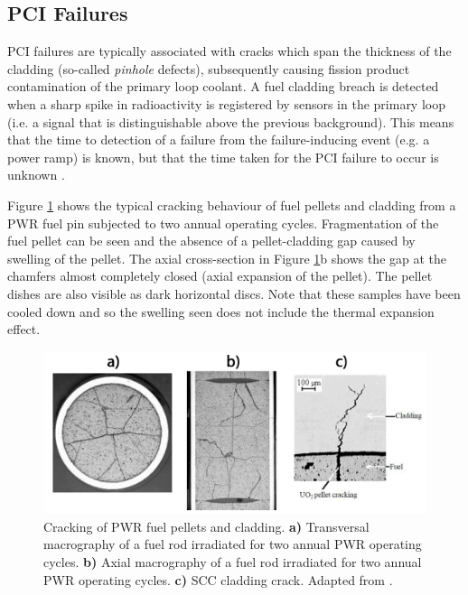 \subsection{PCI Failures}

PCI failures are typically associated with cracks which span the thickness of the cladding (so-called \emph{pinhole} defects), subsequently causing fission product contamination of the primary loop coolant. A fuel cladding breach is detected when a sharp spike in radioactivity is registered by sensors in the primary loop (i.e. a signal that is distinguishable above the previous background). This means that the time to detection of a failure from the failure-inducing event (e.g. a power ramp) is known, but that the time taken for the PCI failure to occur is unknown \cite{bcoxpelletclad1990}. 

Figure \ref{figure:fuelcladdingcrack} shows the typical cracking behaviour of fuel pellets and cladding from a PWR fuel pin subjected to two annual operating cycles. Fragmentation of the fuel pellet can be seen and the absence of a pellet-cladding gap caused by swelling of the pellet. The axial cross-section in Figure \ref{figure:fuelcladdingcrack}b shows the gap at the chamfers almost completely closed (axial expansion of the pellet). The pellet dishes are also visible as dark horizontal discs. Note that these samples have been cooled down and so the swelling seen does not include the thermal expansion effect. 

\begin{figure}[ht] %
\centering
\includegraphics[width=\linewidth]{images/fuelcladdingcrack.png}
\caption[Cracking of PWR fuel pellets and cladding. \textbf{a)} Transversal macrography of a fuel rod irradiated for two annual PWR operating cycles. \textbf{b)} Axial macrography of a fuel rod irradiated for two annual PWR operating cycles. \textbf{c)} SCC cladding failure.]{Cracking of PWR fuel pellets and cladding. \textbf{a)} Transversal macrography of a fuel rod irradiated for two annual PWR operating cycles. \textbf{b)} Axial macrography of a fuel rod irradiated for two annual PWR operating cycles. \textbf{c)} SCC cladding crack. Adapted from \cite{brochard2001modelling}.}
\label{figure:fuelcladdingcrack}
\end{figure}

